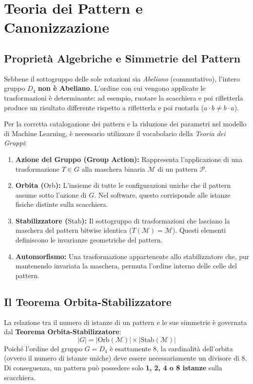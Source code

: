\section{Teoria dei Pattern e Canonizzazione}

\subsection{Proprietà Algebriche e Simmetrie del Pattern}
Sebbene il sottogruppo delle sole rotazioni sia \textit{Abeliano} (commutativo), l'intero gruppo $D_4$ \textbf{non è Abeliano}. L'ordine con cui vengono applicate le trasformazioni è determinante: ad esempio, ruotare la scacchiera e poi rifletterla produce un risultato differente rispetto a rifletterla e poi ruotarla ($a \cdot b \neq b \cdot a$).

Per la corretta catalogazione dei pattern e la riduzione dei parametri nel modello di Machine Learning, è necessario utilizzare il vocabolario della \textit{Teoria dei Gruppi}:

\begin{enumerate}
    \item \textbf{Azione del Gruppo (Group Action):} Rappresenta l'applicazione di una trasformazione $T \in G$ alla maschera binaria $\mathcal{M}$ di un pattern $\mathcal{P}$.
    \item \textbf{Orbita ($\text{Orb}$):} L'insieme di tutte le configurazioni uniche che il pattern assume sotto l'azione di $G$. Nel software, questo corrisponde alle istanze fisiche distinte sulla scacchiera.
    \item \textbf{Stabilizzatore ($\text{Stab}$):} Il sottogruppo di trasformazioni che lasciano la maschera del pattern bitwise identica ($T(\mathcal{M}) = \mathcal{M}$). Questi elementi definiscono le invarianze geometriche del pattern.
    \item \textbf{Automorfismo:} Una trasformazione appartenente allo stabilizzatore che, pur mantenendo invariata la maschera, permuta l'ordine interno delle celle del pattern.
\end{enumerate}

\subsection{Il Teorema Orbita-Stabilizzatore}
La relazione tra il numero di istanze di un pattern e le sue simmetrie è governata dal \textbf{Teorema Orbita-Stabilizzatore}:
\begin{equation}
    |G| = |\text{Orb}(\mathcal{M})| \times |\text{Stab}(\mathcal{M})|
\end{equation}
Poiché l'ordine del gruppo $G = D_4$ è esattamente 8, la cardinalità dell'orbita (ovvero il numero di istanze uniche) deve essere necessariamente un divisore di 8. Di conseguenza, un pattern può possedere solo \textbf{1, 2, 4 o 8 istanze} sulla scacchiera.

